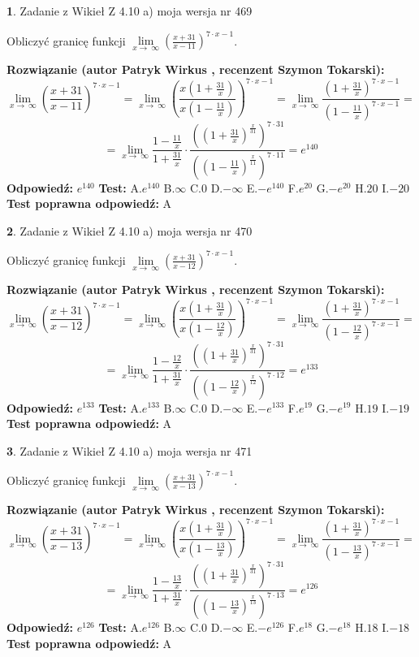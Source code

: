 \documentclass[12pt, a4paper]{article}
\theoremstyle{definition} %
\newtheorem{zad}{}
\newcommand{\zadStart}[1]{\begin{zad}#1\newline}
\newcommand{\zadStop}{\end{zad}}
\newcommand{\rozwStart}[2]{\noindent \textbf{Rozwiązanie (autor #1 , recenzent #2): }\newline}
\newcommand{\rozwStop}{\newline}
\newcommand{\odpStart}{\noindent \textbf{Odpowiedź:}\newline}
\newcommand{\odpStop}{\newline}
\newcommand{\testStart}{\noindent \textbf{Test:}\newline}
\newcommand{\testStop}{\newline}
\newcommand{\kluczStart}{\noindent \textbf{Test poprawna odpowiedź:}\newline}
\newcommand{\kluczStop}{\newline}
\begin{document}
\zadStart{Zadanie z Wikieł Z 4.10 a) moja wersja nr 469}

Obliczyć granicę funkcji  $\lim\limits_{x\to\ \infty}(\frac{x+31}{x-11})^{7\cdot x-1}$.
\zadStop
\rozwStart{Patryk Wirkus}{Szymon Tokarski}
$$\lim\limits_{x\to\ \infty}(\frac{x+31}{x-11})^{7\cdot x-1} = \lim\limits_{x\to\ \infty}(\frac{x(1+\frac{31}{x})}{x(1-\frac{11}{x})})^{7\cdot x-1}=\lim\limits_{x\to\ \infty}\frac{(1+\frac{31}{x})^{7\cdot x-1}}{(1-\frac{11}{x})^{7\cdot x-1}}=$$
$$=\lim\limits_{x\to\ \infty}\frac{1-\frac{11}{x}}{1+\frac{31}{x}}\cdot\frac{((1+\frac{31}{x})^{\frac{x}{31}})^{7\cdot31}}{((1-\frac{11}{x})^{\frac{x}{11}})^{7\cdot11}}=e^{140}$$
\rozwStop
\odpStart
$e^{140}$
\odpStop
\testStart
A.$e^{140}$ B.$\infty$ C.$0$ D.$-\infty$ E.$-e^{140}$
F.$e^{20}$ G.$-e^{20}$
H.$20$
I.$-20$
\testStop
\kluczStart
A
\kluczStop



\zadStart{Zadanie z Wikieł Z 4.10 a) moja wersja nr 470}

Obliczyć granicę funkcji  $\lim\limits_{x\to\ \infty}(\frac{x+31}{x-12})^{7\cdot x-1}$.
\zadStop
\rozwStart{Patryk Wirkus}{Szymon Tokarski}
$$\lim\limits_{x\to\ \infty}(\frac{x+31}{x-12})^{7\cdot x-1} = \lim\limits_{x\to\ \infty}(\frac{x(1+\frac{31}{x})}{x(1-\frac{12}{x})})^{7\cdot x-1}=\lim\limits_{x\to\ \infty}\frac{(1+\frac{31}{x})^{7\cdot x-1}}{(1-\frac{12}{x})^{7\cdot x-1}}=$$
$$=\lim\limits_{x\to\ \infty}\frac{1-\frac{12}{x}}{1+\frac{31}{x}}\cdot\frac{((1+\frac{31}{x})^{\frac{x}{31}})^{7\cdot31}}{((1-\frac{12}{x})^{\frac{x}{12}})^{7\cdot12}}=e^{133}$$
\rozwStop
\odpStart
$e^{133}$
\odpStop
\testStart
A.$e^{133}$ B.$\infty$ C.$0$ D.$-\infty$ E.$-e^{133}$
F.$e^{19}$ G.$-e^{19}$
H.$19$
I.$-19$
\testStop
\kluczStart
A
\kluczStop



\zadStart{Zadanie z Wikieł Z 4.10 a) moja wersja nr 471}

Obliczyć granicę funkcji  $\lim\limits_{x\to\ \infty}(\frac{x+31}{x-13})^{7\cdot x-1}$.
\zadStop
\rozwStart{Patryk Wirkus}{Szymon Tokarski}
$$\lim\limits_{x\to\ \infty}(\frac{x+31}{x-13})^{7\cdot x-1} = \lim\limits_{x\to\ \infty}(\frac{x(1+\frac{31}{x})}{x(1-\frac{13}{x})})^{7\cdot x-1}=\lim\limits_{x\to\ \infty}\frac{(1+\frac{31}{x})^{7\cdot x-1}}{(1-\frac{13}{x})^{7\cdot x-1}}=$$
$$=\lim\limits_{x\to\ \infty}\frac{1-\frac{13}{x}}{1+\frac{31}{x}}\cdot\frac{((1+\frac{31}{x})^{\frac{x}{31}})^{7\cdot31}}{((1-\frac{13}{x})^{\frac{x}{13}})^{7\cdot13}}=e^{126}$$
\rozwStop
\odpStart
$e^{126}$
\odpStop
\testStart
A.$e^{126}$ B.$\infty$ C.$0$ D.$-\infty$ E.$-e^{126}$
F.$e^{18}$ G.$-e^{18}$
H.$18$
I.$-18$
\testStop
\kluczStart
A
\kluczStop
\end{document}
